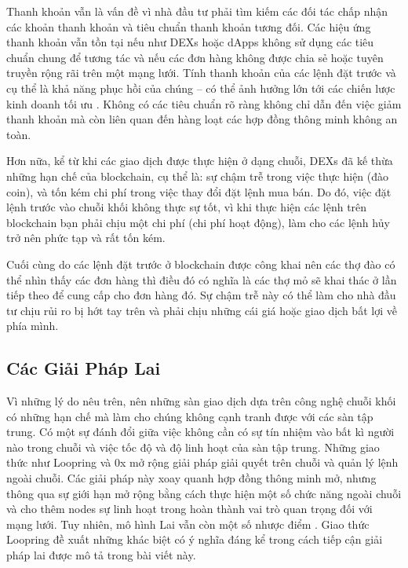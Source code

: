 \documentclass{article}
\begin{document}
\begin{multicols}{2}
Thanh khoản vẫn là vấn đề vì nhà đầu tư phải tìm kiếm các đối tác chấp nhận các khoản thanh khoản và tiêu chuẩn thanh khoản tương đối. Các hiệu ứng thanh khoản vẫn tồn tại nếu như DEXs hoặc dApps không sử dụng các tiêu chuẩn chung để tương tác và nếu các đơn hàng không được chia sẻ hoặc tuyên truyền rộng rãi trên một mạng lưới. Tính thanh khoản của các lệnh đặt trước và cụ thể là khả năng phục hồi của chúng – có thể ảnh hưởng lớn tới các chiến lược kinh doanh tối ưu \cite{limitorderliquidity}. Không có các tiêu chuẩn rõ ràng không chỉ dẫn đến việc giảm thanh khoản mà còn liên quan đến hàng loạt các hợp đồng thông minh không an toàn.

Hơn nữa, kể từ khi các giao dịch được thực hiện ở dạng chuỗi, DEXs đã kế thừa những hạn chế của blockchain, cụ thể là:  sự chậm trễ trong việc thực hiện (đào coin), và tốn kém chi phí trong việc thay đổi đặt lệnh mua bán. Do đó, việc đặt lệnh trước vào chuỗi khối không thực sự tốt, vì khi thực hiện các lệnh trên blockchain bạn phải chịu một chi phí (chi phí hoạt động), làm cho các lệnh hủy trở nên phức tạp và rất tốn kém. 

Cuối cùng do các lệnh đặt trước ở blockchain được công khai nên các thợ đào có thể nhìn thấy các đơn hàng thì điều đó có nghĩa là các thợ mỏ sẽ khai thác ở lần tiếp theo để cung cấp cho đơn hàng đó. Sự chậm trễ này có thể làm cho nhà đầu tư chịu rủi ro bị hớt tay trên và phải chịu những cái giá hoặc giao dịch bất lợi về phía mình.

\subsection{Các Giải Pháp Lai}
Vì những lý do nêu trên, nên những sàn giao dịch dựa trên công nghệ chuỗi khối có những hạn chế mà làm cho chúng không cạnh tranh được với các sàn tập trung. Có một sự đánh đổi giữa việc không cần có sự tín nhiệm vào bất kì người nào trong chuỗi và việc tốc độ và độ linh hoạt của sàn tập trung. Những giao thức như Loopring và 0x \cite{warren20170x} mở rộng giải pháp giải quyết trên chuỗi và quản lý lệnh ngoài chuỗi. Các giải pháp này xoay quanh hợp đồng thông minh mở, nhưng thông qua sự giới hạn mở rộng bằng cách thực hiện một số chức năng ngoài chuỗi và cho thêm nodes sự linh hoạt trong hoàn thành vai trò quan trọng đối với mạng lưới. Tuy nhiên, mô hình Lai vẫn còn một số nhược điểm \cite{costofdecent}. Giao thức Loopring đề xuất những khác biệt có ý nghĩa đáng kể trong cách tiếp cận giải pháp lai được mô tả trong bài viết này.



\end{multicols}
\end{document}
